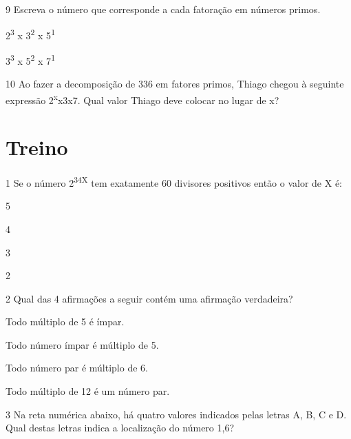\pagebreak
\num{9} Escreva o número que corresponde a cada fatoração em números primos.

\begin{escolha}
\item 2\textsuperscript{3} x 3\textsuperscript{2} x 5\textsuperscript{1}  

\reduline{360\hfill}

\item 3\textsuperscript{3} x 5\textsuperscript{2} x 7\textsuperscript{1}

\reduline{4725\hfill}
\end{escolha}

\num{10} Ao fazer a decomposição de 336 em fatores primos, Thiago chegou
à seguinte expressão 2\textsuperscript{x}x3x7. Qual valor Thiago deve 
colocar no lugar de x?

\begin{emptybox}
\vspace{3.5cm}
\end{emptybox}

\section{Treino}

\num{1} Se o número 2\textsuperscript{3}\textsuperscript{4}\textsuperscript{X} tem exatamente 60 divisores positivos então o valor de X é:

\begin{escolha}
  \item 5
  \item 4
  \item 3
  \item 2
\end{escolha}

\num{2} Qual das 4 afirmações a seguir contém uma afirmação verdadeira? 

\begin{escolha}
\item
  Todo múltiplo de 5 é ímpar.
\item
  Todo número ímpar é múltiplo de 5.
\item
  Todo número par é múltiplo de 6.
\item
  Todo múltiplo de 12 é um número par. 
\end{escolha}

\pagebreak
\num{3} Na reta numérica abaixo, há quatro valores indicados pelas
letras A, B, C e D. Qual destas letras indica a localização do número
1,6?

